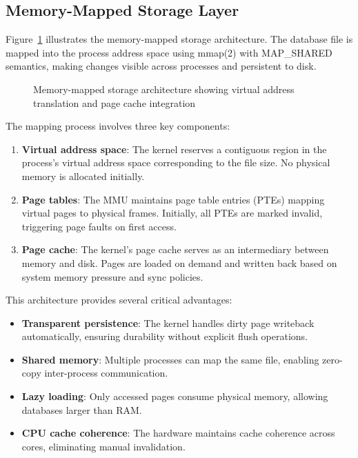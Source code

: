 \documentclass[10pt,conference]{IEEEtran}
\begin{document}
\subsection{Memory-Mapped Storage Layer}

Figure~\ref{fig:mmap-architecture} illustrates the memory-mapped storage architecture. The database file is mapped into the process address space using mmap(2) with MAP\_SHARED semantics, making changes visible across processes and persistent to disk.

\begin{figure}[htbp]
\centerline{}
\caption{Memory-mapped storage architecture showing virtual address translation and page cache integration}
\label{fig:mmap-architecture}
\end{figure}

The mapping process involves three key components:

\begin{enumerate}
\item \textbf{Virtual address space}: The kernel reserves a contiguous region in the process's virtual address space corresponding to the file size. No physical memory is allocated initially.

\item \textbf{Page tables}: The MMU maintains page table entries (PTEs) mapping virtual pages to physical frames. Initially, all PTEs are marked invalid, triggering page faults on first access.

\item \textbf{Page cache}: The kernel's page cache serves as an intermediary between memory and disk. Pages are loaded on demand and written back based on system memory pressure and sync policies.
\end{enumerate}

This architecture provides several critical advantages:

\begin{itemize}
\item \textbf{Transparent persistence}: The kernel handles dirty page writeback automatically, ensuring durability without explicit flush operations.
\item \textbf{Shared memory}: Multiple processes can map the same file, enabling zero-copy inter-process communication.
\item \textbf{Lazy loading}: Only accessed pages consume physical memory, allowing databases larger than RAM.
\item \textbf{CPU cache coherence}: The hardware maintains cache coherence across cores, eliminating manual invalidation.
\end{itemize}
\end{document}
